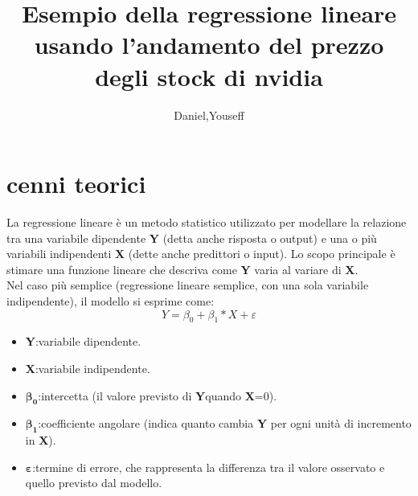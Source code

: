 \documentclass[12pt]{article}
\author{Daniel,Youseff}
\title{Esempio della regressione lineare usando l'andamento del prezzo degli stock di nvidia}
\begin{document}
\maketitle
\section{cenni teorici}
La regressione lineare è un metodo statistico utilizzato per modellare la relazione tra una variabile dipendente
\textbf{Y} (detta anche risposta o output) e una o più variabili indipendenti 
\textbf{X} (dette anche predittori o input). Lo scopo principale è stimare una funzione lineare che descriva come \textbf{Y} 
varia al variare di \textbf{X}.
\\Nel caso più semplice (regressione lineare semplice, con una sola variabile indipendente), il modello si esprime come:
\begin{equation}
    Y=\beta_0+\beta_1*X+\varepsilon  
\end{equation}
\begin{itemize}
    \item \textbf{Y}:variabile dipendente.
    \item \textbf{X}:variabile indipendente.
    \item \begin{math}\mathbf{\beta_0}\end{math}:intercetta (il valore previsto di \textbf{Y}quando \textbf{X}=0).
    \item \begin{math} \mathbf{\beta_1}\end{math}:coefficiente angolare (indica quanto cambia \textbf{Y} per ogni unità
          di incremento in \textbf{X}).
    \item \begin{math}\mathbf{\varepsilon}\end{math}:termine di errore, che rappresenta la differenza
          tra il valore osservato e quello previsto dal modello.
\end{itemize}
\end{document}
